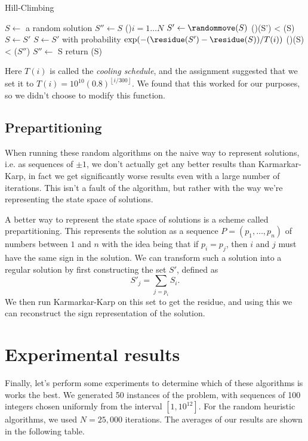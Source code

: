 \documentclass[a4paper, 10pt, twocolumn, twoside]{article}
\begin{document}
\begin{algorithm}
\caption{Hill-Climbing}
\DontPrintSemicolon
$S\leftarrow$ a random solution\;
$S''\leftarrow S$\;
\For(){$i = 1 \ldots N$}{
    $S'\leftarrow\randommove(S)$\;
    \eIf(){\residue(S') < \residue(S)}{
        $S\leftarrow S'$\;
    }{
        $S\leftarrow S'$ with probability $\exp(-(\residue(S')-\residue(S)) / T(i))$\;
    }
    \If(){\residue(S) < \residue($S''$)}{
        $S''\leftarrow$ S\;
    }
}
return \residue(S)
\end{algorithm}

Here $T(i)$ is called the \emph{cooling schedule}, and the assignment suggested that we set it to $T(i)=10^{10}(0.8)^{\left\lfloor i / 300\right\rfloor}.$ We found that this worked for our purposes, so we didn't choose to modify this function.

\subsection{Prepartitioning}
When running these random algorithms on the naive way to represent solutions, i.e. as sequences of $\pm 1$, we don't actually get any better results than Karmarkar-Karp, in fact we get significantly worse results even with a large number of iterations. This isn't a fault of the algorithm, but rather with the way we're representing the state space of solutions.

A better way to represent the state space of solutions is a scheme called prepartitioning. This represents the solution as a sequence $P=(p_1,\ldots, p_n)$ of numbers between $1$ and $n$ with the idea being that if $p_i=p_j$, then $i$ and $j$ must have the same sign in the solution. We can transform such a solution into a regular solution by first constructing the set $S'$, defined as
\[
    S'_j=\sum_{j=p_i} S_i
.\] 
We then run Karmarkar-Karp on this set to get the residue, and using this we can reconstruct the sign representation of the solution.

\section{Experimental results}

Finally, let's perform some experiments to determine which of these algorithms is works the best. We generated 50 instances of the problem, with sequences of 100 integers chosen uniformly from the interval $[1,10^{12}]$. For the random heuristic algorithms, we used $N=25,000$ iterations. The averages of our results are shown in the following table. 
\end{document}
